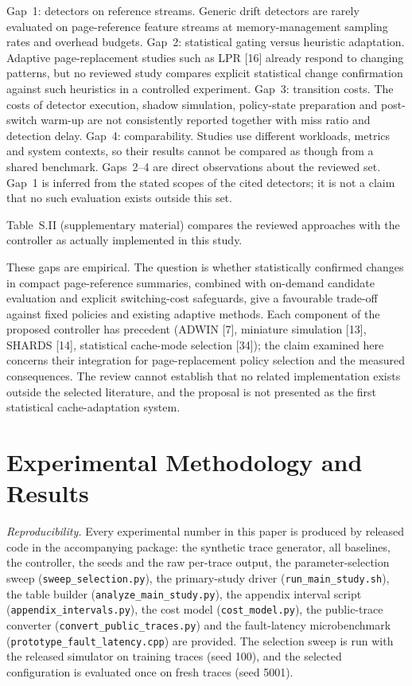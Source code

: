 \documentclass[10pt,twocolumn,a4paper]{IEEEtran}
\begin{document}
Gap~1: detectors on reference streams. Generic drift detectors are rarely
evaluated on page-reference feature streams at memory-management sampling
rates and overhead budgets. Gap~2: statistical gating versus heuristic
adaptation. Adaptive page-replacement studies such as LPR [16] already respond
to changing patterns, but no reviewed study compares explicit statistical
change confirmation against such heuristics in a controlled experiment.
Gap~3: transition costs. The costs of detector execution, shadow simulation,
policy-state preparation and post-switch warm-up are not consistently reported
together with miss ratio and detection delay. Gap~4: comparability. Studies use
different workloads, metrics and system contexts, so their results cannot be
compared as though from a shared benchmark. Gaps~2--4 are direct observations
about the reviewed set. Gap~1 is inferred from the stated scopes of the cited
detectors; it is not a claim that no such evaluation exists outside this set.

Table~S.II (supplementary material) compares the reviewed approaches with
the controller as actually implemented in this study.



These gaps are empirical. The question is whether statistically confirmed
changes in compact page-reference summaries, combined with on-demand candidate
evaluation and explicit switching-cost safeguards, give a favourable trade-off
against fixed policies and existing adaptive methods. Each component of the
proposed controller has precedent (ADWIN [7], miniature simulation [13],
SHARDS [14], statistical cache-mode selection [34]); the claim examined here
concerns their integration for page-replacement policy selection and the
measured consequences. The review cannot establish that no related
implementation exists outside the selected literature, and the proposal is not
presented as the first statistical cache-adaptation system.

\section{Experimental Methodology and Results}
\label{sec:eval}

\emph{Reproducibility.} Every experimental number in this paper is produced
by released code in the accompanying package: the synthetic trace generator,
all baselines, the controller, the seeds and the raw per-trace output, the
parameter-selection sweep (\texttt{sweep\_selection.py}), the primary-study
driver (\texttt{run\_main\_study.sh}), the table builder
(\texttt{analyze\_main\_study.py}), the appendix interval script
(\texttt{appendix\_intervals.py}), the cost model (\texttt{cost\_model.py}),
the public-trace converter (\texttt{convert\_public\_traces.py}) and the
fault-latency microbenchmark (\texttt{prototype\_fault\_latency.cpp}) are
provided. The selection sweep is run with the released simulator on training
traces (seed 100), and the selected configuration is evaluated once on fresh
traces (seed 5001).
\end{document}
